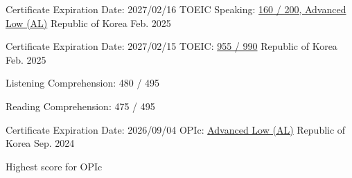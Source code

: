 

\begin{cventries}

  \cventry
    {Certificate Expiration Date: 2027/02/16} %
    {TOEIC Speaking: \href{https://drive.google.com/file/d/1HgNQ4gUgvdH7-rlSQieMzz84lg-ij9-u/view?usp=sharing}{160 / 200, Advanced Low (AL)}} %
    {Republic of Korea} %
    {Feb. 2025} %
    {
    }

  \cventry
    {Certificate Expiration Date: 2027/02/15} %
    {TOEIC: \href{https://drive.google.com/file/d/14gmf1MtT_eW6QlUEyug6A36HshiLP5mz/view?usp=sharing}{955 / 990}} %
    {Republic of Korea} %
    {Feb. 2025} %
    {
      \begin{cvitems} %
        \item {Listening Comprehension: 480 / 495}
        \item {Reading Comprehension: 475 / 495}
      \end{cvitems}
    }

  \cventry
    {Certificate Expiration Date: 2026/09/04} %
    {OPIc: \href{https://drive.google.com/file/d/1WA33mSp0jaU5LKnqtJ-dRN5UOLOgsfLA/view?usp=sharing}{Advanced Low (AL)}} %
    {Republic of Korea} %
    {Sep. 2024} %
    {
      \begin{cvitems} %
        \item {Highest score for OPIc}
      \end{cvitems}
    }


\end{cventries}
